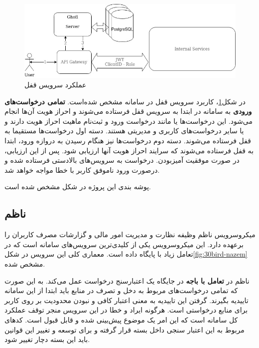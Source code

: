 \begin{figure}
	\vspace{1cm}
	\centering
	\includegraphics[scale=0.5]{figures/30bird-ghofl.jpg}
	\caption{عملکرد سرویس قفل}
	\label{fig:30bird-ghofl}
\end{figure}

در شکل\ref{fig:30bird-ghofl}، کاربرد سرویس قفل در سامانه مشخص شده‌است. \textbf{تمامی درخواست‌های ورودی} به سامانه در ابتدا به سرویس قفل فرستاده می‌شوند و احراز هویت آن‌ها انجام می‌شود. این درخواست‌ها یا مانند درخواست ورود و ثبت‌نام ماهیت احراز هویت دارند و یا سایر درخواست‌های کاربری و مدیریتی هستند. دسته اول درخواست‌ها مستقیما به قفل فرستاده می‌شوند. دسته دوم درخواست‌ها نیز هنگام رسیدن به دروازه ‌ورود، ابتدا به قفل فرستاده می‌شوند که سرایند احراز هویت  آنها ارزیابی شود. پس از این ارزیابی، در صورت موفقیت آمیز‌بودن. درخواست به سرویس‌های بالادستی فرستاده شده و درصورت ورود ناموفق کاربر با خطا مواجه خواهد شد.


پوشه بندی این پروژه در شکل مشخص شده است.

\subsection{ناظم}
میکروسرویس ناظم وظیفه نظارت و مدیریت امور مالی و گزارشات مصرف کاربران را برعهده دارد. این میکروسرویس یکی از کلیدی‌ترین سرویس‌های سامانه است که در تعامل زیاد با پایگاه داده است. معماری کلی این سرویس در شکل\ref{fig:30bird-nazem} مشخص شده.

ناظم در \textbf{تعامل با باجه} در جایگاه یک اعتبارسنج درخواست عمل می‌کند. به این صورت که تمامی درخواست‌های مربوط به دخل و تصرف در منابع باید ابتدا از این سامانه تاییدیه بگیرند. گرفتن این تاییدیه به معنی اعتبار کافی و نبودن محدودیت بر روی کاربر برای منابع درخواستی است. هرگونه ایراد و خطا در این سرویس منجر توقف عملکرد کل سامانه است که این امر یک موضوع پیش‌بینی شده و قابل قبول است. کد‌های مربوط به این اعتبار سنجی داخل بسته  قرار گرفته و برای توسعه و تغییر این قوانین باید این بسته دچار تغییر شود.

